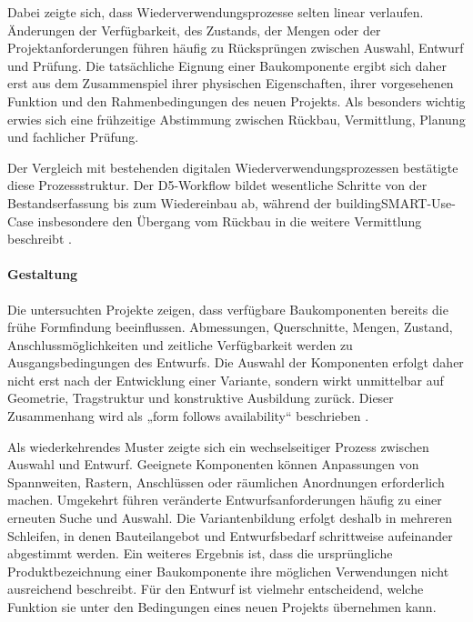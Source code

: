 \documentclass[type=zwischenbericht,theme=dark]{zukunftbau}
\begin{document}
\begin{SemioNest}
Dabei zeigte sich, dass Wiederverwendungsprozesse selten linear verlaufen. Änderungen der Verfügbarkeit, des Zustands, der Mengen oder der Projektanforderungen führen häufig zu Rücksprüngen zwischen Auswahl, Entwurf und Prüfung. Die tatsächliche Eignung einer Baukomponente ergibt sich daher erst aus dem Zusammenspiel ihrer physischen Eigenschaften, ihrer vorgesehenen Funktion und den Rahmenbedingungen des neuen Projekts. Als besonders wichtig erwies sich eine frühzeitige Abstimmung zwischen Rückbau, Vermittlung, Planung und fachlicher Prüfung.

Der Vergleich mit bestehenden digitalen Wiederverwendungsprozessen bestätigte diese Prozessstruktur. Der D5-Workflow bildet wesentliche Schritte von der Bestandserfassung bis zum Wiedereinbau ab, während der buildingSMART-Use-Case insbesondere den Übergang vom Rückbau in die weitere Vermittlung beschreibt \cite{de-wolf-d5-digital-circular-workflow-2024,buildingsmart-benelux-decommissioning-to-reuse-2024}.

\begin{SemioNest}
\paragraph{Gestaltung}
Die untersuchten Projekte zeigen, dass verfügbare Baukomponenten bereits die frühe Formfindung beeinflussen. Abmessungen, Querschnitte, Mengen, Zustand, Anschlussmöglichkeiten und zeitliche Verfügbarkeit werden zu Ausgangsbedingungen des Entwurfs. Die Auswahl der Komponenten erfolgt daher nicht erst nach der Entwicklung einer Variante, sondern wirkt unmittelbar auf Geometrie, Tragstruktur und konstruktive Ausbildung zurück. Dieser Zusammenhang wird als „form follows availability“ beschrieben \cite{bruetting-senatore-fivet-form-follows-availability-2019}.

Als wiederkehrendes Muster zeigte sich ein wechselseitiger Prozess zwischen Auswahl und Entwurf. Geeignete Komponenten können Anpassungen von Spannweiten, Rastern, Anschlüssen oder räumlichen Anordnungen erforderlich machen. Umgekehrt führen veränderte Entwurfsanforderungen häufig zu einer erneuten Suche und Auswahl. Die Variantenbildung erfolgt deshalb in mehreren Schleifen, in denen Bauteilangebot und Entwurfsbedarf schrittweise aufeinander abgestimmt werden. Ein weiteres Ergebnis ist, dass die ursprüngliche Produktbezeichnung einer Baukomponente ihre möglichen Verwendungen nicht ausreichend beschreibt. Für den Entwurf ist vielmehr entscheidend, welche Funktion sie unter den Bedingungen eines neuen Projekts übernehmen kann.


\end{SemioNest}
\end{SemioNest}
\end{document}
